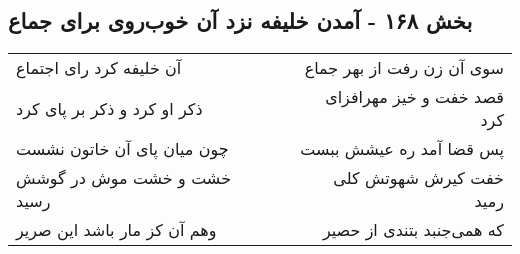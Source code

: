 \begin{center}
\section*{بخش ۱۶۸ - آمدن خلیفه نزد آن خوب‌روی برای جماع}
\label{sec:sh168}
\begin{longtable}{l p{0.5cm} r}
آن خلیفه کرد رای اجتماع
&&
سوی آن زن رفت از بهر جماع
\\
ذکر او کرد و ذکر بر پای کرد
&&
قصد خفت و خیز مهرافزای کرد
\\
چون میان پای آن خاتون نشست
&&
پس قضا آمد ره عیشش ببست
\\
خشت و خشت موش در گوشش رسید
&&
خفت کیرش شهوتش کلی رمید
\\
وهم آن کز مار باشد این صریر
&&
که همی‌جنبد بتندی از حصیر
\\
\end{longtable}
\end{center}
